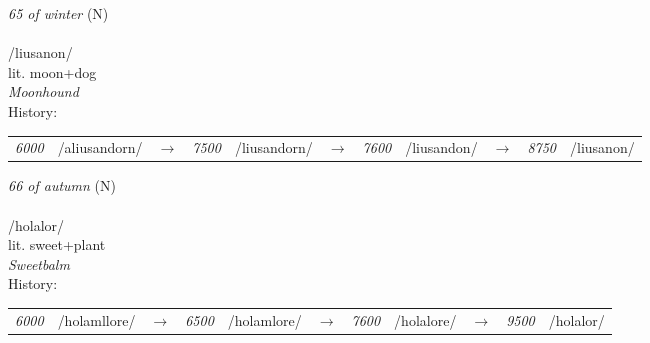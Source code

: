 \vspace{15pt}
\begin{nopagebreak}
 \textit{65 of winter} (N)\\
\\
\noindent /lius{\textprimstress}anon/\\
\noindent lit. moon+dog\\
\noindent \textit{Moonhound}\\


\noindent History:

\vspace{-0pt}
\hspace{40pt}
\begin{tabular}{ccc}
\textit{6000} & /aliusandorn/&$\rightarrow$ & \textit{7500} & /liusandorn/&$\rightarrow$ & \textit{7600} & /liusandon/&$\rightarrow$ & \textit{8750} & /liusanon/& \\
\end{tabular}

\vspace{20pt}\hline

\end{nopagebreak}
\filbreak



\vspace{15pt}
\begin{nopagebreak}
 \textit{66 of autumn} (N)\\
\\
\noindent /hol{\textprimstress}alor/\\
\noindent lit. sweet+plant\\
\noindent \textit{Sweetbalm}\\


\noindent History:

\vspace{-0pt}
\hspace{40pt}
\begin{tabular}{ccc}
\textit{6000} & /holamllore/&$\rightarrow$ & \textit{6500} & /holamlore/&$\rightarrow$ & \textit{7600} & /holalore/&$\rightarrow$ & \textit{9500} & /holalor/& \\
\end{tabular}

\vspace{20pt}\hline

\end{nopagebreak}
\filbreak



